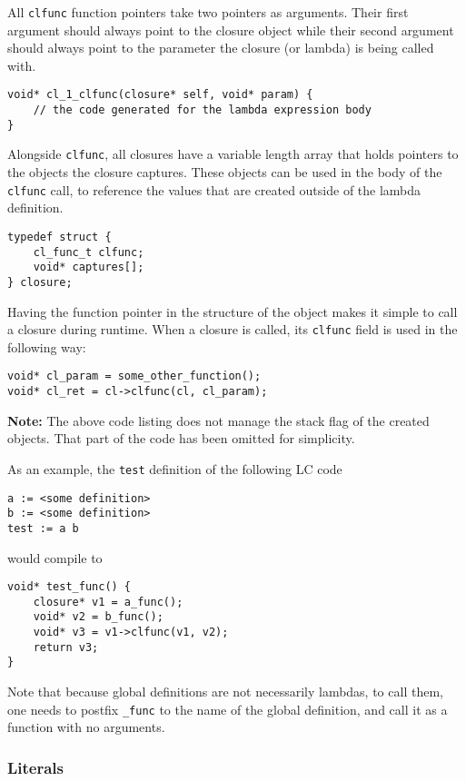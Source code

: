 \documentclass[12pt]{article}
\begin{document}
All \verb$clfunc$ function pointers take two pointers as arguments. Their first
argument should always point to the closure object while their second argument
should always point to the parameter the closure (or lambda) is being called
with.
\vspace{1em}
\\\noindent\begin{minipage}{\textwidth}
\begin{lstlisting}
void* cl_1_clfunc(closure* self, void* param) {
    // the code generated for the lambda expression body
}
\end{lstlisting}
\end{minipage}

Alongside \verb$clfunc$, all closures have a variable length array that holds
pointers to the objects the closure captures. These objects can be used in the
body of the \verb$clfunc$ call, to reference the values that are created outside
of the lambda definition.

\begin{lstlisting}
typedef struct {
    cl_func_t clfunc;
    void* captures[];
} closure;
\end{lstlisting}

Having the function pointer in the structure of the object makes it simple to
call a closure during runtime. When a closure is called, its \verb$clfunc$ field
is used in the following way:
\begin{lstlisting}
void* cl_param = some_other_function();
void* cl_ret = cl->clfunc(cl, cl_param); 
\end{lstlisting}
\textbf{Note:} The above code listing does not manage the stack flag of the
created objects. That part of the code has been omitted for simplicity.

As an example, the \verb$test$ definition of the following LC code
\begin{lstlisting}
a := <some definition>
b := <some definition>
test := a b
\end{lstlisting}
would compile to
\begin{lstlisting}
void* test_func() {
    closure* v1 = a_func();
    void* v2 = b_func();
    void* v3 = v1->clfunc(v1, v2);
    return v3;
}
\end{lstlisting}
Note that because global definitions are not necessarily lambdas, to call them,
one needs to postfix \verb$_func$ to the name of the global definition, and call
it as a function with no arguments.


\subsubsection{Literals}
\end{document}

